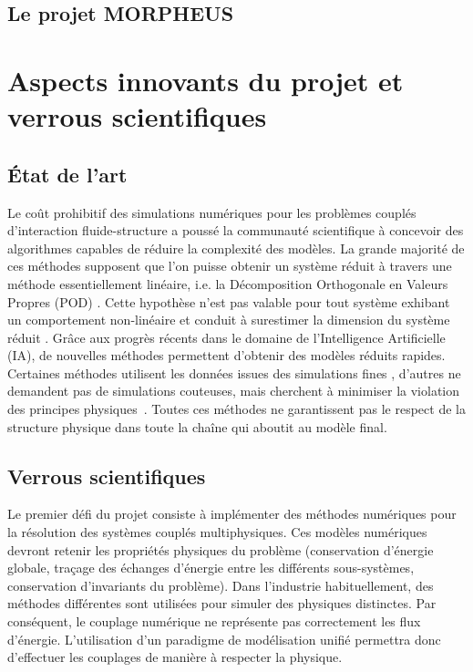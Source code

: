 \documentclass[12pt, french]{article}
\begin{document}
\subsection{Le projet MORPHEUS}


\section{Aspects innovants du projet et verrous scientifiques}

\subsection{État de l'art}
Le coût prohibitif des simulations numériques pour les problèmes couplés d'interaction fluide-structure
a poussé la communauté scientifique à concevoir des algorithmes capables de réduire la complexité des modèles. La grande majorité de ces méthodes supposent que l'on puisse obtenir un système réduit à travers une méthode essentiellement linéaire, i.e. la Décomposition Orthogonale en Valeurs Propres (POD) \cite{shinde2019,tello2020fluid}. Cette hypothèse n’est pas valable pour tout
système exhibant un comportement non-linéaire et conduit à surestimer la dimension
du système réduit \cite{kerschen2005}. Grâce aux progrès récents dans le domaine de l’Intelligence
Artificielle (IA), de nouvelles méthodes permettent d’obtenir des modèles réduits rapides. Certaines
méthodes utilisent les données issues des simulations fines \cite{lee2020}, d'autres ne demandent pas de simulations couteuses, mais cherchent à minimiser la violation des principes physiques~\cite{sun2020physics}.  Toutes ces méthodes ne garantissent pas le respect de la structure physique dans toute la chaîne qui aboutit au modèle final. 


\subsection{Verrous scientifiques}


Le premier défi du projet consiste à implémenter des méthodes numériques pour la résolution des systèmes couplés multiphysiques. Ces modèles numériques devront retenir les propriétés physiques du problème (conservation d’énergie globale, traçage des échanges d’énergie entre les différents sous-systèmes, conservation d’invariants du problème). Dans l'industrie habituellement, des méthodes différentes sont utilisées pour simuler des physiques distinctes. Par conséquent, le couplage numérique ne représente pas correctement les flux d’énergie. L’utilisation d’un paradigme de modélisation unifié permettra donc d’effectuer les couplages de manière à respecter la physique. \\
\end{document}
